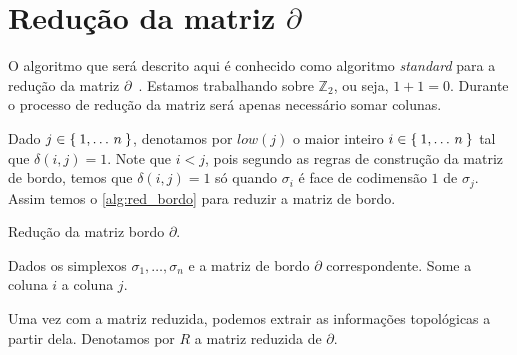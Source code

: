 \section{Redução da matriz $\partial$}
O algoritmo que será descrito aqui é conhecido como algoritmo \textit{standard}
para a redução da matriz $\partial$~\cite{Edelsbrunner2000}. Estamos trabalhando
sobre $\mathbb{Z}_2$, ou seja, $1+1 = 0$. Durante o processo de redução da matriz
será apenas necessário somar colunas.

Dado $j \in \Set{1,\dots\,n}$, denotamos por $low(j)$ o maior inteiro
$i \in \Set{1,\dots\,n} $ tal que $\delta(i,j)=1$. Note que $i < j$, pois segundo
as regras de construção da matriz de bordo, temos que $\delta(i,j) = 1$ só
quando $\sigma_i$ é face de codimensão $1$ de $\sigma_j$. Assim temos o
\autoref{alg:red_bordo} para reduzir a matriz de bordo.

\begin{algorithm}[htb]
  \caption{Redução da matriz bordo $\partial$.}
  \label{alg:red_bordo}
  \begin{algorithmic}[1]
    \State Dados os simplexos $\sigma_1, \dots, \sigma_n$ e a matriz de bordo
    $\partial$ correspondente.
        \State Some a coluna $i$ a coluna $j$.
      \EndWhile
    \EndFor
  \end{algorithmic}
\end{algorithm}

Uma vez com a matriz reduzida, podemos extrair as informações topológicas a partir
dela. Denotamos por $R$ a matriz reduzida de $\partial$.
